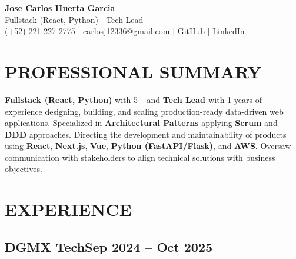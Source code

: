 \documentclass[a4paper,10pt]{article}
\newcommand{\kw}[1]{\textbf{\textcolor{keyword}{#1}}}
\begin{document}
\begin{center}
{\bfseries\LARGE Jose Carlos Huerta Garcia} \\
Fullstack (React, Python) | Tech Lead \\
(+52) 221 227 2775 | carlosj12336@gmail.com | \href{https://github.com/jcarloshg}{GitHub} | \href{https://www.linkedin.com/in/jose-carlos-huerta-garcia-773952212}{LinkedIn}
\end{center}

\section*{PROFESSIONAL SUMMARY}
\kw{Fullstack (React, Python)} with 5+ and \kw{Tech Lead } with 1 years of experience designing, building, and scaling production-ready data-driven web applications. Specialized in \kw{Architectural Patterns} applying \kw{Scrum} and \kw{DDD} approaches. Directing the development and maintainability of products using \kw{React}, \kw{Next.js}, \kw{Vue}, \kw{Python (FastAPI/Flask)}, and \kw{AWS}. Oversaw communication with stakeholders to align technical solutions with business objectives.

\section*{EXPERIENCE}

\subsection*{\small DGMX Tech\hfill\textbf{Sep 2024 -- Oct 2025}}
\end{document}
